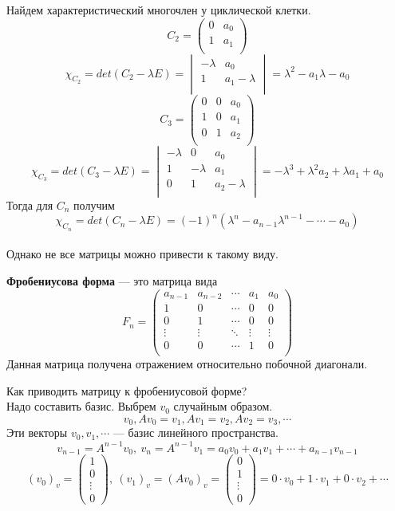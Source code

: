 Найдем характеристический многочлен у циклической клетки.\\
\[C_2=\begin{pmatrix}
0 & a_0 \\
1 & a_1 \\
\end{pmatrix}\]
\[\chi_{C_2}= det(C_2-\lambda E)=\begin{vmatrix}
-\lambda & a_0 \\
1 & a_1-\lambda \\
\end{vmatrix}=\lambda^2-a_1\lambda-a_0\]
\[C_3=\begin{pmatrix}
0 & 0 & a_0 \\
1 &  0 & a_1 \\
0 & 1 & a_2 \\
\end{pmatrix}\]
\[\chi_{C_3}= det(C_3-\lambda E)=\begin{vmatrix}
-\lambda & 0 & a_0 \\
1 & -\lambda & a_1\\
0 & 1 & a_2-\lambda \\
\end{vmatrix}=-\lambda^3+\lambda^2a_2+\lambda a_1+a_0\]
Тогда для $C_n$ получим
$$\chi_{C_n}=det(C_n-\lambda E)=(-1)^n(\lambda^n-a_{n-1}\lambda^{n-1}-\cdots-a_0)$$
\\
Однако не все матрицы можно привести к такому виду.
\begin{definition}
    \textbf{Фробениусова форма} --- это матрица вида
\[F_n=\begin{pmatrix}
a_{n-1} & a_{n-2} & \cdots & a_1 & a_0 \\
1 & 0 & \cdots & 0 & 0 \\
0 & 1 & \cdots & 0 & 0 \\
\vdots & \vdots & \ddots & \vdots & \vdots \\
0 & 0 & \cdots & 1 & 0 \\
\end{pmatrix}\]
Данная матрица получена отражением относительно побочной диагонали.
\end{definition}
Как приводить матрицу к фробениусовой форме?\\
Надо составить базис. Выбрем $v_0$ случайным образом.\\
$$v_0, Av_0=v_1, Av_1=v_2, Av_2=v_3,\cdots$$
Эти векторы $v_0, v_1,\cdots$ --- базис линейного пространства.\\
$$v_{n-1}=A^{n-1}v_0,~v_n=A^{n-1}v_1=a_0v_0+a_1v_1+\cdots +a_{n-1}v_{n-1}$$
\[(v_0)_v=\begin{pmatrix}
1 \\
0 \\
\vdots \\
0
\end{pmatrix},~(v_1)_v=(Av_0)_v=\begin{pmatrix}
0 \\
1 \\
\vdots \\
0
\end{pmatrix}=0\cdot v_0+1\cdot v_1+0\cdot v_2+\cdots\]
